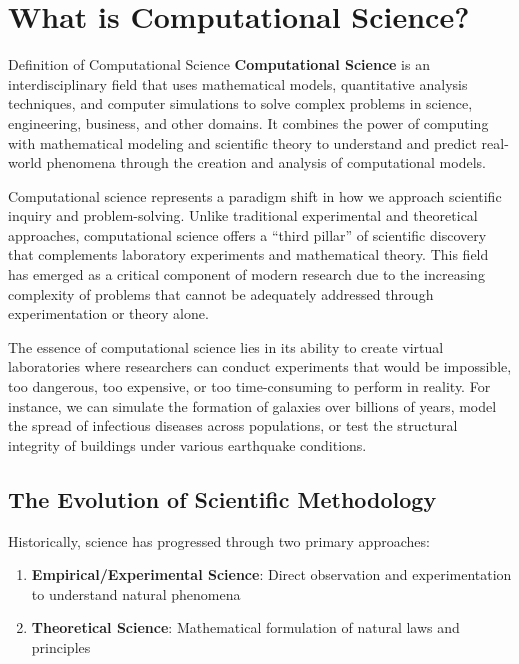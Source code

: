 \section{What is Computational Science?}

\begin{conceptcard}{Definition of Computational Science}
\textbf{Computational Science} is an interdisciplinary field that uses mathematical models, quantitative analysis techniques, and computer simulations to solve complex problems in science, engineering, business, and other domains. It combines the power of computing with mathematical modeling and scientific theory to understand and predict real-world phenomena through the creation and analysis of computational models.
\end{conceptcard}

Computational science represents a paradigm shift in how we approach scientific inquiry and problem-solving. Unlike traditional experimental and theoretical approaches, computational science offers a ``third pillar'' of scientific discovery that complements laboratory experiments and mathematical theory. This field has emerged as a critical component of modern research due to the increasing complexity of problems that cannot be adequately addressed through experimentation or theory alone.

The essence of computational science lies in its ability to create virtual laboratories where researchers can conduct experiments that would be impossible, too dangerous, too expensive, or too time-consuming to perform in reality. For instance, we can simulate the formation of galaxies over billions of years, model the spread of infectious diseases across populations, or test the structural integrity of buildings under various earthquake conditions.

\subsection{The Evolution of Scientific Methodology}

Historically, science has progressed through two primary approaches:

\begin{enumerate}
  \item \textbf{Empirical/Experimental Science}: Direct observation and experimentation to understand natural phenomena
  \item \textbf{Theoretical Science}: Mathematical formulation of natural laws and principles
\end{enumerate}

